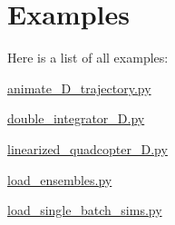 \section{Examples}
Here is a list of all examples\+:\begin{DoxyCompactItemize}
\item 
\mbox{\hyperlink{animate_3_d_trajectory_8py-example}{animate\+\_\+D\+\_\+trajectory.\+py}}
\item 
\mbox{\hyperlink{double_integrator_2_d_8py-example}{double\+\_\+integrator\+\_\+D.\+py}}
\item 
\mbox{\hyperlink{linearized_quadcopter_3_d_8py-example}{linearized\+\_\+quadcopter\+\_\+D.\+py}}
\item 
\mbox{\hyperlink{load_ensembles_8py-example}{load\+\_\+ensembles.\+py}}
\item 
\mbox{\hyperlink{load_single_batch_sims_8py-example}{load\+\_\+single\+\_\+batch\+\_\+sims.\+py}}
\end{DoxyCompactItemize}
